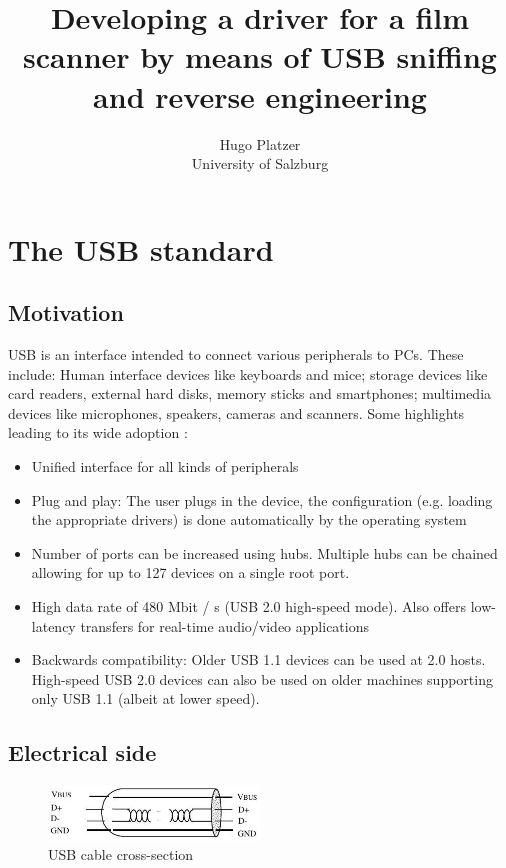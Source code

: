 \documentclass{article}
\begin{document}
\title{Developing a driver for a film scanner by means of USB sniffing and reverse engineering}
\author{Hugo Platzer \\ University of Salzburg}
\maketitle

\section{The USB standard}

\subsection{Motivation}

USB is an interface intended to connect various peripherals to PCs. These include:
Human interface devices like keyboards and mice; storage devices like card readers,
external hard disks, memory sticks and smartphones; multimedia devices like microphones, speakers,
cameras and scanners. Some highlights leading to its wide adoption \cite[p. 11]{usbstd}:

\begin{itemize}
  \item Unified interface for all kinds of peripherals
  \item Plug and play: The user plugs in the device, the configuration (e.g. loading the appropriate drivers)
  is done automatically by the operating system
  \item Number of ports can be increased using hubs. Multiple hubs can be chained
        allowing for up to 127 devices on a single root port.
  \item High data rate of 480 Mbit / s (USB 2.0 high-speed mode). Also offers low-latency
        transfers for real-time audio/video applications
  \item Backwards compatibility: Older USB 1.1 devices can be used at 2.0 hosts.
        High-speed USB 2.0 devices can also be used on older
        machines supporting only USB 1.1 (albeit at lower speed).
\end{itemize}

\subsection{Electrical side}

\begin{figure}[!htbp]
  \caption{USB cable cross-section \cite[p. 17]{usbstd}}
  \centering
  \includegraphics[width=0.5\textwidth]{images/usb_cable.jpg}
\end{figure}
\end{document}
